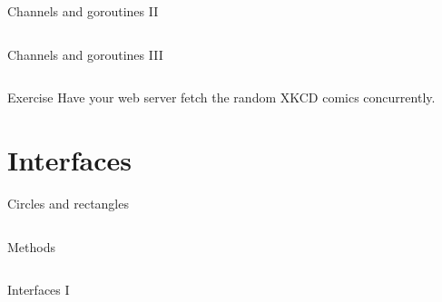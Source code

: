 \documentclass[10pt]{beamer}
\begin{document}
	
	\begin{frame}[t,fragile]{Channels and goroutines II}
		\inputminted[firstnumber=last,fontsize=\footnotesize]{go}{code/14b_stack.go}
	\end{frame}
									
	
	\begin{frame}[t,fragile]{Channels and goroutines III}
		\inputminted[firstnumber=last,fontsize=\footnotesize]{go}{code/14c_stack.go}
	\end{frame}
	
	
	\begin{frame}[fragile]{Exercise}
		Have your web server fetch the random XKCD comics concurrently.
	\end{frame}

	
	\section{Interfaces}
							
	
	\begin{frame}[t,fragile]{Circles and rectangles}
		\inputminted[fontsize=\scriptsize]{go}{code/15_shapes.go}
	\end{frame}
	
	
	\begin{frame}[t,fragile]{Methods}
		\inputminted[fontsize=\scriptsize]{go}{code/16_methods.go}
	\end{frame}
	
	
	\begin{frame}[t,fragile]{Interfaces I}
		\inputminted[fontsize=\scriptsize]{go}{code/17_interfaces.go}
	\end{frame}
	
	
\end{document}
